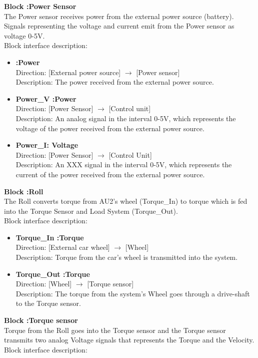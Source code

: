 \textbf{Block :Power Sensor}\\
The Power sensor receives power from the external power source (battery). Signals representing the voltage and current emit from the Power sensor as voltage 0-5V.\\
Block interface description:

\begin{itemize}
	\item \textbf{:Power}\\
		Direction: [External power source] $\rightarrow$ [Power sensor]\\
		Description: The power received from the external power source.
	\item \textbf{Power\_V :Power}\\
		Direction: [Power Sensor] $\rightarrow$ [Control unit]\\
		Description: An analog signal in the interval 0-5V, which represents the voltage of the power received from the external power source.
	\item \textbf{Power\_I: Voltage}\\
		Direction: [Power Sensor] $\rightarrow$ [Control Unit]\\
		Description: An XXX signal in the interval 0-5V, which represents the current of the power received from the external power source.
\end{itemize}

\textbf{Block :Roll}\\
The Roll converts torque from AU2's wheel (Torque\_In) to torque which is fed into the Torque Sensor and Load System (Torque\_Out).\\ 
Block interface description:

\begin{itemize}
	\item \textbf{Torque\_In :Torque}\\
		Direction: [External car wheel] $\rightarrow$ [Wheel]\\
		Description: Torque from the car's wheel is transmitted into the system.
	\item \textbf{Torque\_Out :Torque}\\
		Direction: [Wheel] $\rightarrow$ [Torque sensor]\\
		Description: The torque from the system's Wheel goes through a drive-shaft to the Torque sensor.
\end{itemize}

\textbf{Block :Torque sensor}\\
Torque from the Roll goes into the Torque sensor and the Torque sensor transmits two analog Voltage signals that represents the Torque and the Velocity.
\\Block interface description:

